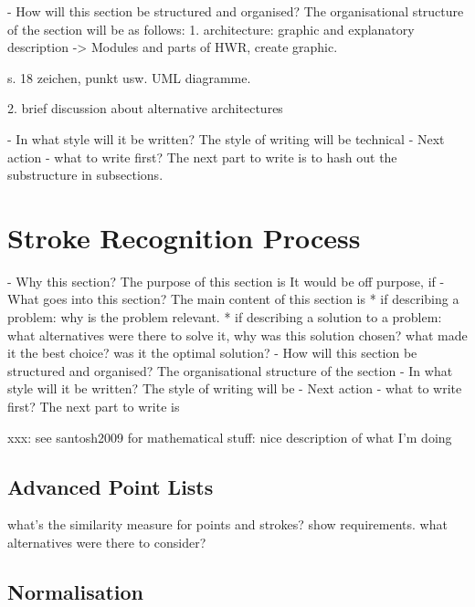- How will this section be structured and organised?
  The organisational structure of the section will be as follows:
  1. architecture: graphic and explanatory description
  -> Modules and parts of HWR, create graphic.

  s. 18 zeichen, punkt usw. UML diagramme.
     
  2. brief discussion about alternative architectures

- In what style will it be written?
  The style of writing will be technical
- Next action - what to write first?
  The next part to write is to hash out the substructure in subsections.





\section{Stroke Recognition Process}
\label{sec:hwre:strokerecognitionprocess}

- Why this section? 
  The purpose of this section is 
  It would be off purpose, if 
- What goes into this section?
  The main content of this section is 
  * if describing a problem: why is the problem relevant.
  * if describing a solution to a problem: what alternatives were
    there to solve it, why was this solution chosen? 
    what made it the best choice? was it the optimal solution?
- How will this section be structured and organised?
  The organisational structure of the section 
- In what style will it be written?
  The style of writing will be 
- Next action - what to write first?
  The next part to write is

xxx: see santosh2009 for mathematical stuff: nice description of what I'm doing


\subsection{Advanced Point Lists}
\label{sec:hwre:advancedpointlists}



what's the similarity measure for
points and strokes?
show requirements.
what alternatives were there to consider?

\subsection{Normalisation}
\label{sec:hwre:normalisation}



